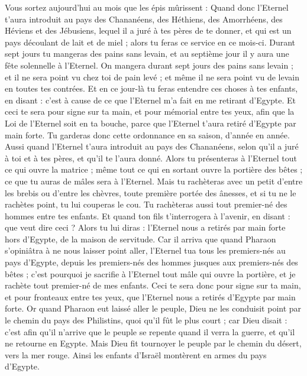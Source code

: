 \begin{multicols}{2}
Vous sortez aujourd'hui au mois que les épis mûrissent :
Quand donc l'Eternel t'aura introduit au pays des Chananéens, des Héthiens, des Amorrhéens, des Héviens et des Jébusiens, lequel il a juré à tes pères de te donner, et qui est un pays découlant de lait et de miel ; alors tu feras ce service en ce mois-ci.
Durant sept jours tu mangeras des pains sans levain, et au septième jour il y aura une fête solennelle à l'Eternel.
On mangera durant sept jours des pains sans levain ; et il ne sera point vu chez toi de pain levé ; et même il ne sera point vu de levain en toutes tes contrées.
Et en ce jour-là tu feras entendre ces choses à tes enfants, en disant : c'est à cause de ce que l'Eternel m'a fait en me retirant d'Egypte.
Et ceci te sera pour signe sur ta main, et pour mémorial entre tes yeux, afin que la Loi de l'Eternel soit en ta bouche, parce que l'Eternel t'aura retiré d'Egypte par main forte.
Tu garderas donc cette ordonnance en sa saison, d'année en année.
Aussi quand l'Eternel t'aura introduit au pays des Chananéens, selon qu'il a juré à toi et à tes pères, et qu'il te l'aura donné.
Alors tu présenteras à l'Eternel tout ce qui ouvre la matrice ; même tout ce qui en sortant ouvre la portière des bêtes ; ce que tu auras de mâles sera à l'Eternel.
Mais tu rachèteras avec un petit d'entre les brebis ou d'entre les chèvres, toute première portée des ânesses, et si tu ne le rachètes point, tu lui couperas le cou. Tu rachèteras aussi tout premier-né des hommes entre tes enfants.
Et quand ton fils t'interrogera à l'avenir, en disant : que veut dire ceci ? Alors tu lui diras : l'Eternel nous a retirés par main forte hors d'Egypte, de la maison de servitude.
Car il arriva que quand Pharaon s'opiniâtra à ne nous laisser point aller, l'Eternel tua tous les premiers-nés au pays d'Egypte, depuis les premiers-nés des hommes jusques aux premiers-nés des bêtes ; c'est pourquoi je sacrifie à l'Eternel tout mâle qui ouvre la portière, et je rachète tout premier-né de mes enfants.
Ceci te sera donc pour signe sur ta main, et pour fronteaux entre tes yeux, que l'Eternel nous a retirés d'Egypte par main forte.
Or quand Pharaon eut laissé aller le peuple, Dieu ne les conduisit point par le chemin du pays des Philistins, quoi qu'il fût le plus court ; car Dieu disait : c'est afin qu'il n'arrive que le peuple se repente quand il verra la guerre, et qu'il ne retourne en Egypte.
Mais Dieu fit tournoyer le peuple par le chemin du désert, vers la mer rouge. Ainsi les enfants d'Israël montèrent en armes du pays d'Egypte.

\end{multicols}
